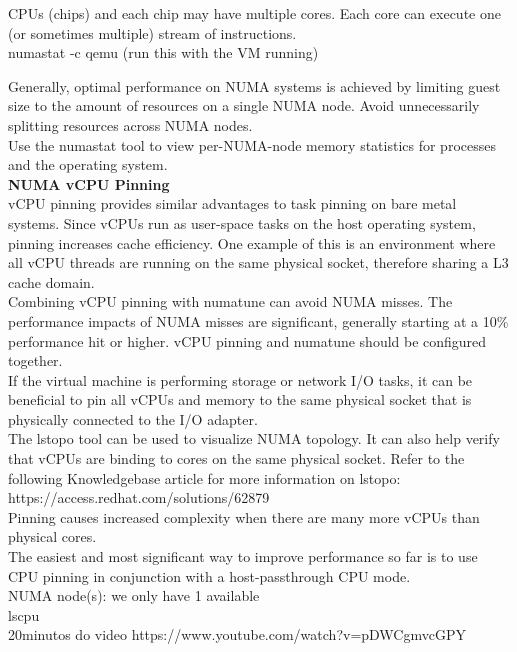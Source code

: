 \documentclass[11pt, a4paper, oneside]{article}
\theoremstyle{definition}
\begin{document}
CPUs (chips) and each chip may have multiple cores. Each core can execute one (or sometimes multiple) stream of instructions.\\

numastat -c qemu (run this with the VM running)

Generally, optimal performance on NUMA systems is achieved by limiting guest size to the amount of resources on a single NUMA node. Avoid unnecessarily splitting resources across NUMA nodes.\\
Use the numastat tool to view per-NUMA-node memory statistics for processes and the operating system.\\

\textbf{NUMA vCPU Pinning}\\
 vCPU pinning provides similar advantages to task pinning on bare metal systems. Since vCPUs run as user-space tasks on the host operating system, pinning increases cache efficiency. One example of this is an environment where all vCPU threads are running on the same physical socket, therefore sharing a L3 cache domain.\\
Combining vCPU pinning with numatune can avoid NUMA misses. The performance impacts of NUMA misses are significant, generally starting at a 10$\%$ performance hit or higher. vCPU pinning and numatune should be configured together.\\
If the virtual machine is performing storage or network I/O tasks, it can be beneficial to pin all vCPUs and memory to the same physical socket that is physically connected to the I/O adapter. \\

The lstopo tool can be used to visualize NUMA topology. It can also help verify that vCPUs are binding to cores on the same physical socket. Refer to the following Knowledgebase article for more information on lstopo: https://access.redhat.com/solutions/62879\\

Pinning causes increased complexity when there are many more vCPUs than physical cores. \\

The easiest and most significant way to improve performance so far is to use CPU pinning in conjunction with a host-passthrough CPU mode. \\

NUMA node(s): we only have 1 available\\
lscpu\\
20minutos do video https://www.youtube.com/watch?v=pDWCgmvcGPY
\end{document}
